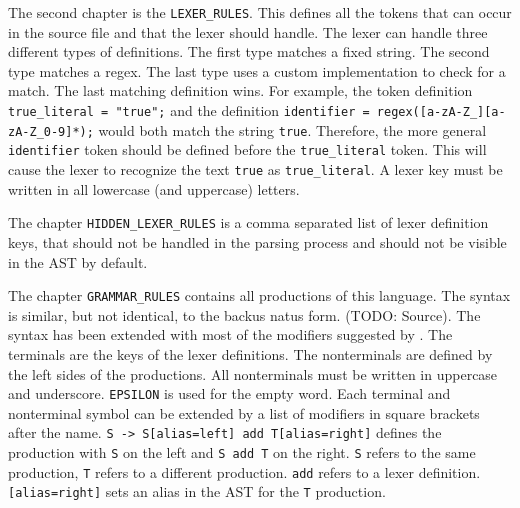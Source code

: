 The second chapter is the \verb|LEXER_RULES|. 
This defines all the tokens that can occur in the source file and that the lexer should handle. 
The lexer can handle three different types of definitions. 
The first type matches a fixed string. The second type matches a regex. 
The last type uses a custom implementation to check for a match. 
The last matching definition wins. 
For example, the token definition \verb|true_literal = "true";| and the definition \verb|identifier = regex([a-zA-Z_][a-zA-Z_0-9]*);| would both match the string \verb|true|. 
Therefore, the more general \verb|identifier| token should be defined before the \verb|true_literal| token. 
This will cause the lexer to recognize the text \verb|true| as \verb|true_literal|. 
A lexer key must be written in all lowercase (and uppercase) letters.

The chapter \verb|HIDDEN_LEXER_RULES| is a comma separated list of lexer definition keys, 
that should not be handled in the parsing process and should not be visible in the AST by default. 

The chapter \verb|GRAMMAR_RULES| contains all productions of this language. The syntax is similar, but not identical, to the backus natus form. (TODO: Source). The syntax has been extended with most of the modifiers suggested by \cite{GeneratingRewritableAST}. The terminals are the keys of the lexer definitions. The nonterminals are defined by the left sides of the productions. All nonterminals must be written in uppercase and underscore. \verb|EPSILON| is used for the empty word. Each terminal and nonterminal symbol can be extended by a list of modifiers in square brackets after the name. 
\verb|S -> S[alias=left] add T[alias=right]| defines the production with \verb|S| on the left and \verb|S add T| on the right. 
\verb|S| refers to the same production, \verb|T| refers to a different production. 
\verb|add| refers to a lexer definition. 
\verb|[alias=right]| sets an alias in the AST for the \verb|T| production.
